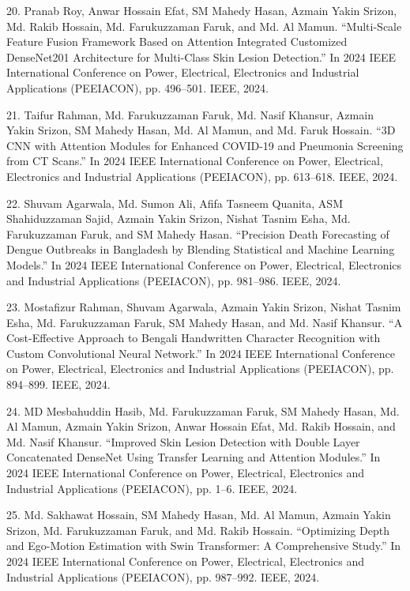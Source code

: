 \documentclass[a4paper,10pt]{article}
\newlength{\cvcolumngapwidth}
\newlength{\cvleftcolumnwidth}
\newlength{\cvrightcolumnwidth}
\newcommand{\cvdurationstyle}[1]{{\small\cvdurationfont\textcolor{cvdurationcolor}{#1}}}
\newlength{\cvafteritemskipamount}
\newlength{\cvparskip}
\newcommand{\cvitem}[2]{
    \begin{minipage}[t]{\cvleftcolumnwidth}
        \raggedleft #1
    \end{minipage}%
    \hspace{\cvcolumngapwidth}%
    \begin{minipage}[t]{\cvrightcolumnwidth}
        \setlength{\parskip}{\cvparskip} #2
    \end{minipage}

    \vspace{\cvafteritemskipamount}
}
\begin{document}
\cvitem{
    \cvdurationstyle{}
}{
20. Pranab Roy, Anwar Hossain Efat, SM Mahedy Hasan, Azmain Yakin Srizon, Md. Rakib Hossain, Md. Farukuzzaman Faruk, and Md. Al Mamun. “Multi-Scale Feature Fusion Framework Based on Attention Integrated Customized DenseNet201 Architecture for Multi-Class Skin Lesion Detection.” In 2024 IEEE International Conference on Power, Electrical, Electronics and Industrial Applications (PEEIACON), pp. 496–501. IEEE, 2024.
}

\cvitem{
    \cvdurationstyle{}
}{
21. Taifur Rahman, Md. Farukuzzaman Faruk, Md. Nasif Khansur, Azmain Yakin Srizon, SM Mahedy Hasan, Md. Al Mamun, and Md. Faruk Hossain. “3D CNN with Attention Modules for Enhanced COVID-19 and Pneumonia Screening from CT Scans.” In 2024 IEEE International Conference on Power, Electrical, Electronics and Industrial Applications (PEEIACON), pp. 613–618. IEEE, 2024.
}

\cvitem{
    \cvdurationstyle{}
}{
22. Shuvam Agarwala, Md. Sumon Ali, Afifa Tasneem Quanita, ASM Shahiduzzaman Sajid, Azmain Yakin Srizon, Nishat Tasnim Esha, Md. Farukuzzaman Faruk, and SM Mahedy Hasan. “Precision Death Forecasting of Dengue Outbreaks in Bangladesh by Blending Statistical and Machine Learning Models.” In 2024 IEEE International Conference on Power, Electrical, Electronics and Industrial Applications (PEEIACON), pp. 981–986. IEEE, 2024.
}

\cvitem{
    \cvdurationstyle{}
}{
23. Mostafizur Rahman, Shuvam Agarwala, Azmain Yakin Srizon, Nishat Tasnim Esha, Md. Farukuzzaman Faruk, SM Mahedy Hasan, and Md. Nasif Khansur. “A Cost-Effective Approach to Bengali Handwritten Character Recognition with Custom Convolutional Neural Network.” In 2024 IEEE International Conference on Power, Electrical, Electronics and Industrial Applications (PEEIACON), pp. 894–899. IEEE, 2024.
}

\cvitem{
    \cvdurationstyle{}
}{
24. MD Mesbahuddin Hasib, Md. Farukuzzaman Faruk, SM Mahedy Hasan, Md. Al Mamun, Azmain Yakin Srizon, Anwar Hossain Efat, Md. Rakib Hossain, and Md. Nasif Khansur. “Improved Skin Lesion Detection with Double Layer Concatenated DenseNet Using Transfer Learning and Attention Modules.” In 2024 IEEE International Conference on Power, Electrical, Electronics and Industrial Applications (PEEIACON), pp. 1–6. IEEE, 2024.
}

\cvitem{
    \cvdurationstyle{}
}{
25. Md. Sakhawat Hossain, SM Mahedy Hasan, Md. Al Mamun, Azmain Yakin Srizon, Md. Farukuzzaman Faruk, and Md. Rakib Hossain. “Optimizing Depth and Ego-Motion Estimation with Swin Transformer: A Comprehensive Study.” In 2024 IEEE International Conference on Power, Electrical, Electronics and Industrial Applications (PEEIACON), pp. 987–992. IEEE, 2024.
}
\end{document}
